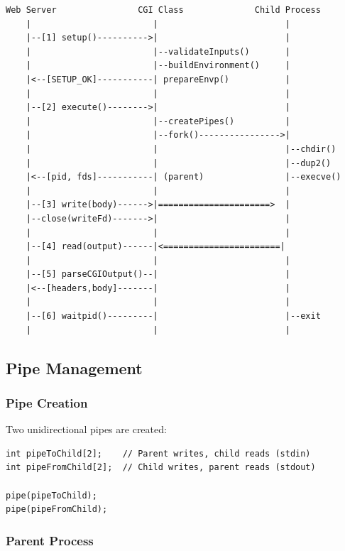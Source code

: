 \documentclass[11pt,a4paper]{article}
\begin{document}
\begin{verbatim}
Web Server                CGI Class              Child Process
    |                        |                         |
    |--[1] setup()---------->|                         |
    |                        |--validateInputs()       |
    |                        |--buildEnvironment()     |
    |<--[SETUP_OK]-----------| prepareEnvp()           |
    |                        |                         |
    |--[2] execute()-------->|                         |
    |                        |--createPipes()          |
    |                        |--fork()---------------->|
    |                        |                         |--chdir()
    |                        |                         |--dup2()
    |<--[pid, fds]-----------| (parent)                |--execve()
    |                        |                         |
    |--[3] write(body)------>|======================>  |
    |--close(writeFd)------->|                         |
    |                        |                         |
    |--[4] read(output)------|<=======================|
    |                        |                         |
    |--[5] parseCGIOutput()--|                         |
    |<--[headers,body]-------|                         |
    |                        |                         |
    |--[6] waitpid()---------|                         |--exit
    |                        |                         |
\end{verbatim}

\subsection{Pipe Management}

\subsubsection{Pipe Creation}

Two unidirectional pipes are created:

\begin{lstlisting}[caption=Pipe Creation]
int pipeToChild[2];    // Parent writes, child reads (stdin)
int pipeFromChild[2];  // Child writes, parent reads (stdout)

pipe(pipeToChild);
pipe(pipeFromChild);
\end{lstlisting}

\subsubsection{Parent Process}
\end{document}
